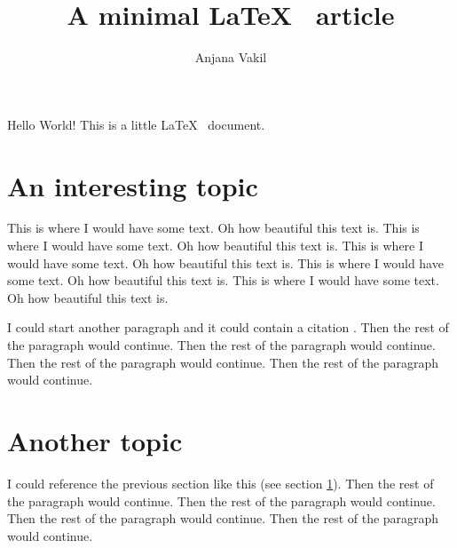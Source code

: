 \documentclass{article}
\author{Anjana Vakil}
\title{A minimal \LaTeX~ article}
\begin{document}
\maketitle

Hello World! This is a little \LaTeX~ document.

\section{An interesting topic}
\label{interesting} 

This is where I would have some text. Oh how beautiful this text is. This is where I would have some text. Oh how beautiful this text is. This is where I would have some text. Oh how beautiful this text is. This is where I would have some text. Oh how beautiful this text is. This is where I would have some text. Oh how beautiful this text is. 

I could start another paragraph and it could contain a citation \parencite{Vakil15}. Then the rest of the paragraph would continue. Then the rest of the paragraph would continue. Then the rest of the paragraph would continue. Then the rest of the paragraph would continue. 

\section{Another topic}
\label{another}

I could reference the previous section like this (see section \ref{interesting}). Then the rest of the paragraph would continue. Then the rest of the paragraph would continue. Then the rest of the paragraph would continue. Then the rest of the paragraph would continue. 

\printbibliography
\end{document}
